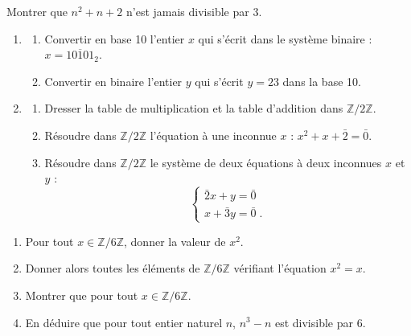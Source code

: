 \begin{exo}
	Montrer que $n^2 + n + 2$ n'est jamais divisible par $3$.
\end{exo}
%
\begin{exo}[Bac 2004]
      \begin{enumerate}
            \item \begin{enumerate}
                        \item Convertir en base 10 l'entier $x$ qui s'\'ecrit dans le syst\`eme binaire :
                              $x = \overline{10101}_2$.
                        \item Convertir en binaire l'entier $y$ qui s'\'ecrit $y = 23$ dans la base 10.
                  \end{enumerate}
            \item \begin{enumerate}
                        \item Dresser la table de multiplication et la table d'addition dans $\mathbb{Z}/2\mathbb{Z}$.
                        \item R\'esoudre dans $\mathbb{Z}/2\mathbb{Z}$ l'\'equation \`a une inconnue $x$ :
                              $x^2 + x + \bar{2} = \bar{0}$.
                        \item R\'esoudre dans $\mathbb{Z}/2\mathbb{Z}$ le syst\`eme de deux \'equations \`a 
                              deux inconnues $x$ et $y$ : 
                              \[
                                    \left\lbrace
                                          \begin{array}{l}
                                                \bar{2} x + y = \bar{0} \\
                                                x + \bar{3} y = \bar{0} \;.
                                          \end{array}
                                    \right.
                              \]
                  \end{enumerate}
      \end{enumerate}
\end{exo}
%
\begin{exo}[Bac 2003]
      \begin{enumerate}
            \item Pour tout $x\in\mathbb{Z}/6\mathbb{Z}$, donner la valeur de $x^2$.
            \item Donner alors toutes les \'el\'ements de $\mathbb{Z}/6\mathbb{Z}$ v\'erifiant 
                  l'\'equation $x^2 = x$.
            \item Montrer que pour tout $x\in\mathbb{Z}/6\mathbb{Z}$.
            \item En d\'eduire que pour tout entier naturel $n$, $n^3 - n$ est divisible par $6$.
      \end{enumerate}
\end{exo}
